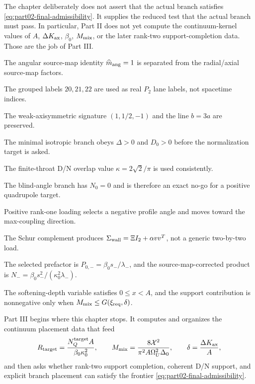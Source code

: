 The chapter deliberately does not assert that the actual branch satisfies \eqref{eq:part02-final-admissibility}.  It supplies the reduced test that the actual branch must pass.  In particular, Part II does not yet compute the continuum-kernel values of \(A\), \(\Delta K_{\rm ax}\), \(\beta_0\), \(M_{\rm mix}\), or the later rank-two support-completion data.  Those are the job of Part III.

\begin{verificationchecklist}
\item The angular source-map identity \(\widehat m_{\rm ang}=1\) is separated from the radial/axial source-map factors.
\item The grouped labels \(20,21,22\) are used as real \(P_2\) lane labels, not spacetime indices.
\item The weak-axisymmetric signature \((1,1/2,-1)\) and the line \(b=3a\) are preserved.
\item The minimal isotropic branch obeys \(\Delta>0\) and \(D_0>0\) before the normalization target is asked.
\item The finite-throat D/N overlap value \(\kappa=2\sqrt2/\pi\) is used consistently.
\item The blind-angle branch has \(N_0=0\) and is therefore an exact no-go for a positive quadrupole target.
\item Positive rank-one loading selects a negative profile angle and moves toward the max-coupling direction.
\item The Schur complement produces \(\Sigma_{\rm wall}=\Xi I_2+\alpha vv^T\), not a generic two-by-two load.
\item The selected prefactor is \(P_{0,-}=\beta_0s_-/\lambda_-\), and the source-map-corrected product is \(N_- = \beta_0s_-^2/(\kappa_0^2\lambda_-)\).
\item The softening-depth variable satisfies \(0\leq x<A\), and the support contribution is nonnegative only when \(M_{\rm mix}\leq G(\xi_{\rm req},\delta)\).
\end{verificationchecklist}

Part III begins where this chapter stops.  It computes and organizes the continuum placement data that feed
\begin{equation}
R_{\rm target}=\frac{N_Q^{\rm target}A}{\beta_0\kappa_0^2},
\qquad
M_{\rm mix}=\frac{8\mathcal{X}^2}{\pi^2A\Omega_U^2\Delta_0},
\qquad
\delta=\frac{\Delta K_{\rm ax}}{A},
\end{equation}
and then asks whether rank-two support completion, coherent D/N support, and explicit branch placement can satisfy the frontier \eqref{eq:part02-final-admissibility}.

